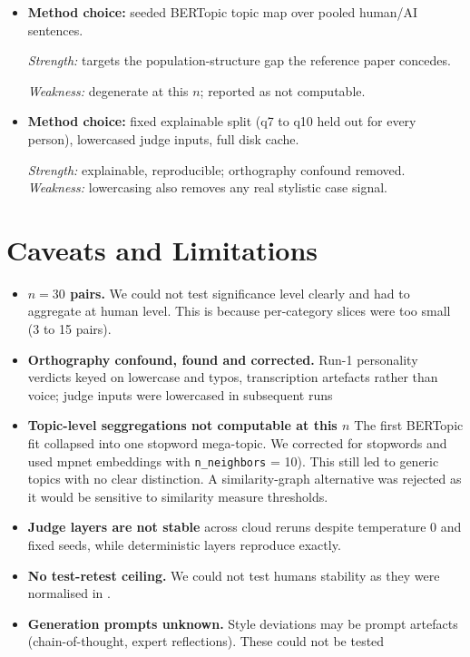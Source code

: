 \documentclass[10pt,twocolumn]{article}
\begin{document}
\begin{itemize}
\emph{Weakness:}
sketch quality bounded by nine short answers.

\item \textbf{Method choice:} seeded BERTopic topic map over pooled
human/AI sentences. 

\emph{Strength:} targets the population-structure gap
the reference paper concedes. 

\emph{Weakness:} degenerate at this $n$;
reported as not computable.

\item \textbf{Method choice:} fixed explainable split (q7 to q10 held out
for every person), lowercased judge inputs, full disk cache.

\emph{Strength:} explainable, reproducible; orthography confound removed.
\emph{Weakness:} lowercasing also removes any real stylistic case signal.
\end{itemize}

\section{Caveats and Limitations}
\begin{itemize}
\item \textbf{$n=30$ pairs.} We could not test significance
level clearly and had to aggregate at human level. This is because
per-category slices were too small (3 to 15 pairs). 
\item \textbf{Orthography confound, found and corrected.} Run-1 personality
verdicts keyed on lowercase and typos, transcription artefacts rather than
voice; judge inputs were lowercased in subsequent runs
\item \textbf{Topic-level seggregations not computable at this $n$} The
first BERTopic fit collapsed into one stopword mega-topic. We corrected for 
stopwords and used mpnet embeddings with \texttt{n\_neighbors} = 10).  This still led to generic topics with no clear distinction. A similarity-graph alternative was rejected as it would be sensitive to similarity measure thresholds.
\item \textbf{Judge layers are not stable} across cloud reruns despite
temperature 0 and fixed seeds, while deterministic layers reproduce
exactly. 
\item \textbf{No test-retest ceiling.} We could not test humans stability as they were normalised in \citet{park2024generative}. 
\item \textbf{Generation prompts unknown.} Style deviations may be prompt
artefacts (chain-of-thought, expert reflections). These could not be tested
\end{itemize}
\end{document}
